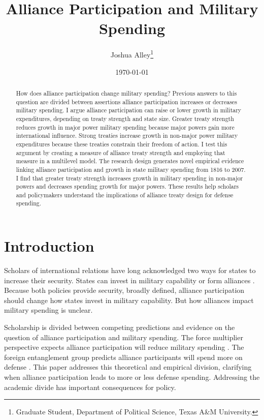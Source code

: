 \documentclass[12pt]{article}
\title{\textbf{Alliance Participation and Military Spending}}
\author{Joshua Alley\footnote{Graduate Student,
Department of Political Science, Texas A\&M University.}}
\date{{\normalsize \today}}
\begin{document}
\maketitle 

\newpage 

\doublespace 

\begin{abstract}
How does alliance participation change military spending? 
Previous answers to this question are divided between assertions alliance participation increases or decreases military spending. 
I argue alliance participation can raise or lower growth in military expenditures, depending on treaty strength and state size. 
Greater treaty strength reduces growth in major power military spending because major powers gain more international influence. 
Strong treaties increase growth in non-major power military expenditures because these treaties constrain their freedom of action. 
I test this argument by creating a measure of alliance treaty strength and employing that measure in a multilevel model. 
The research design generates novel empirical evidence linking alliance participation and growth in state military spending from 1816 to 2007. 
I find that greater treaty strength increases growth in military spending in non-major powers and decreases spending growth for major powers.  
These results help scholars and policymakers understand the implications of alliance treaty design for defense spending. 
\end{abstract}



\section{Introduction}


Scholars of international relations have long acknowledged two ways for states to increase their security. 
States can invest in military capability or form alliances \citep{Morgenthau1948}.
Because both policies provide security, broadly defined, alliance participation should change how states invest in military capability. 
But how alliances impact military spending is unclear. 


Scholarship is divided between competing predictions and evidence on the question of alliance participation and military spending. 
The force multiplier perspective expects alliance participation will reduce military spending \citep{Morrow1993, Conybeare1994, DigiuseppePoast2016}. 
The foreign entanglement group predicts alliance participants will spend more on defense \citep{Diehl1994, MorganPalmer2006}. 
This paper addresses this theoretical and empirical division, clarifying when alliance participation leads to more or less defense spending. 
Addressing the academic divide has important consequences for policy. 
\end{document}
